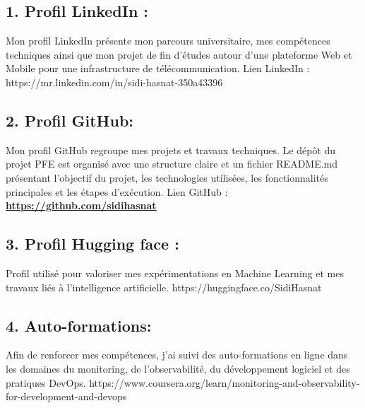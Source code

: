 \documentclass[12pt,a4paper]{report}
\newcommand{\ub}[1]{\uline{\textbf{#1}}}
\begin{document}
\subsection*{1. Profil LinkedIn :}
Mon profil LinkedIn présente mon parcours universitaire, mes compétences techniques ainsi que mon projet de fin d’études autour d’une plateforme Web et Mobile pour une infrastructure de télécommunication. Lien LinkedIn : https://mr.linkedin.com/in/sidi-hasnat-350a43396\par
\subsection*{2. Profil GitHub:}
Mon profil GitHub regroupe mes projets et travaux techniques. Le dépôt du projet PFE est organisé avec une structure claire et un fichier README.md présentant l’objectif du projet, les technologies utilisées, les fonctionnalités principales et les étapes d’exécution. Lien GitHub : \ub{\url{https://github.com/sidihasnat}}\par
\subsection*{3. Profil Hugging face :}
Profil utilisé pour valoriser mes expérimentations en Machine Learning et mes travaux liés à l’intelligence artificielle. https://huggingface.co/SidiHasnat\par
\subsection*{4. Auto-formations:}
Afin de renforcer mes compétences, j’ai suivi des auto-formations en ligne dans les domaines du monitoring, de l’observabilité, du développement logiciel et des pratiques DevOps. https://www.coursera.org/learn/monitoring-and-observability-for-development-and-devops\par
\clearpage
\end{document}
